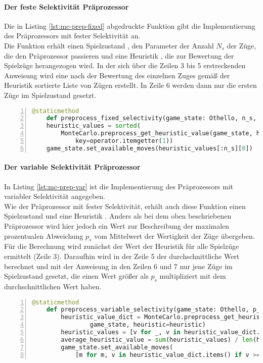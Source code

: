 \paragraph{Der feste Selektivität Präprozessor}
Die in Listing \ref{lst:mc-prep-fixed} abgedruckte Funktion gibt die Implementierung des Präprozessors mit fester Selektivität an.
\\Die Funktion erhält einen Spielzustand , den Parameter  der Anzahl $N_{s}$ der Züge, die den Präprozessor passieren und eine Heuristik , die zur Bewertung der Spielzüge herangezogen wird. In der sich über die Zeilen 3 bis 5 erstreckenden Anweisung wird eine nach der Bewertung des einzelnen Zuges gemäß der Heuristik sortierte Liste von Zügen erstellt. In Zeile 6 werden dann nur die ersten  Züge im Spielzustand  gesetzt.
\begin{lstlisting}[basicstyle=\footnotesize, caption = {Die Funktion \code{preprocess\_fixed\_slectivity}}, language = python, captionpos = t , numbers=left, label={lst:mc-prep-fixed}]
	@staticmethod	    
	def preprocess_fixed_selectivity(game_state: Othello, n_s, heuristic):
    heuristic_values = sorted(
        MonteCarlo.preprocess_get_heuristic_value(game_state, heuristic=heuristic).items(),
            key=operator.itemgetter(1))
    game_state.set_available_moves(heuristic_values[:n_s][0])
\end{lstlisting}
\paragraph{Der variable Selektivität Präprozessor}
In Listing \ref{lst:mc-prep-var} ist die Implementierung des Präprozessors mit variabler Selektivität angegeben.
\\Wie der Präprozessor mit fester Selektivität, erhält auch diese Funktion einen Spielzustand  und eine Heuristik . Anders als bei dem oben beschriebenen Präprozessor wird hier jedoch ein Wert  zur Beschreibung der maximalen prozentualen Abweichung $p_{s}$ vom Mittelwert der Wertigkeit der Züge übergeben.
\\Für die Berechnung wird zunächst der Wert der Heuristik für alle Spielzüge ermittelt (Zeile 3). Daraufhin wird in der Zeile 5 der durchschnittliche Wert berechnet und mit der Anweisung in den Zeilen 6 und 7 nur jene Züge im Spielzustand gesetzt, die einen Wert größer als $p_{s}$ multipliziert mit dem durchschnittlichen Wert haben.
\newpage
\begin{lstlisting}[basicstyle=\footnotesize, caption = {Die Funktion \code{preprocess\_variable\_slectivity}}, language = python, captionpos = t , numbers=left, label={lst:mc-prep-var}]
	@staticmethod
    def preprocess_variable_selectivity(game_state: Othello, p_s, heuristic):
        heuristic_value_dict = MonteCarlo.preprocess_get_heuristic_value(
        		game_state, heuristic=heuristic)
        heuristic_values = [v for _, v in heuristic_value_dict.items()]
        average_heuristic_value = sum(heuristic_values) / len(heuristic_values)
        game_state.set_available_moves(
            [m for m, v in heuristic_value_dict.items() if v >= p_s * average_heuristic_value])
\end{lstlisting}
